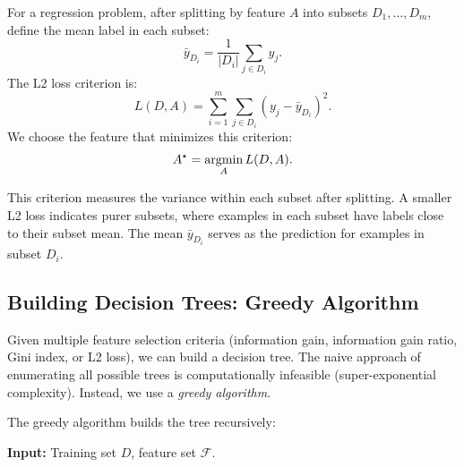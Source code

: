 \documentclass[../main]{subfiles}
\begin{document}
\begin{definition}
    For a regression problem, after splitting by feature $A$ into subsets $D_1,\ldots,D_m$, define the mean label in each subset:
    \begin{equation}
        \bar{y}_{D_i} = \frac{1}{|D_i|}\sum_{j \in D_i} y_j.
    \end{equation}
    The L2 loss criterion is:
    \begin{equation}
        L(D,A)
        = \sum_{i=1}^m \sum_{j \in D_i} (y_j - \bar{y}_{D_i})^2.
    \end{equation}
    We choose the feature that minimizes this criterion:
    \begin{equation}
        A^\star = \mathop{\mathrm{argmin}}_A L(D,A).
    \end{equation}
\end{definition}

This criterion measures the variance within each subset after splitting.  A smaller L2 loss indicates purer subsets, where examples in each subset have labels close to their subset mean.  The mean $\bar{y}_{D_i}$ serves as the prediction for examples in subset $D_i$.

\subsection{Building Decision Trees: Greedy Algorithm}

Given multiple feature selection criteria (information gain, information gain ratio, Gini index, or L2 loss), we can build a decision tree.  The naive approach of enumerating all possible trees is computationally infeasible (super-exponential complexity).  Instead, we use a \emph{greedy algorithm}.

The greedy algorithm builds the tree recursively:

    \textbf{Input:} Training set $D$, feature set $\mathcal{F}$.
    
\end{document}
